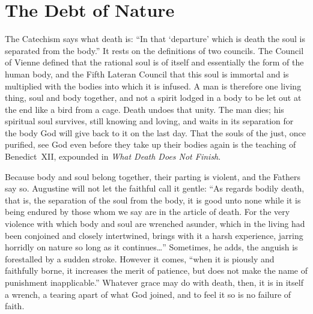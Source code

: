 \section{The Debt of Nature}

The Catechism says what death is: ``In that `departure' which is death the soul is separated from the body.'' It rests on the definitions of two councils. The Council of Vienne defined that the rational soul is of itself and essentially the form of the human body, and the Fifth Lateran Council that this soul is immortal and is multiplied with the bodies into which it is infused. A man is therefore one living thing, soul and body together, and not a spirit lodged in a body to be let out at the end like a bird from a cage. Death undoes that unity. The man dies; his spiritual soul survives, still knowing and loving, and waits in its separation for the body God will give back to it on the last day. That the souls of the just, once purified, see God even before they take up their bodies again is the teaching of Benedict~XII, expounded in \emph{What Death Does Not Finish}.

Because body and soul belong together, their parting is violent, and the Fathers say so. Augustine will not let the faithful call it gentle: ``As regards bodily death, that is, the separation of the soul from the body, it is good unto none while it is being endured by those whom we say are in the article of death. For the very violence with which body and soul are wrenched asunder, which in the living had been conjoined and closely intertwined, brings with it a harsh experience, jarring horridly on nature so long as it continues\ldots'' Sometimes, he adds, the anguish is forestalled by a sudden stroke. However it comes, ``when it is piously and faithfully borne, it increases the merit of patience, but does not make the name of punishment inapplicable.'' Whatever grace may do with death, then, it is in itself a wrench, a tearing apart of what God joined, and to feel it so is no failure of faith.

